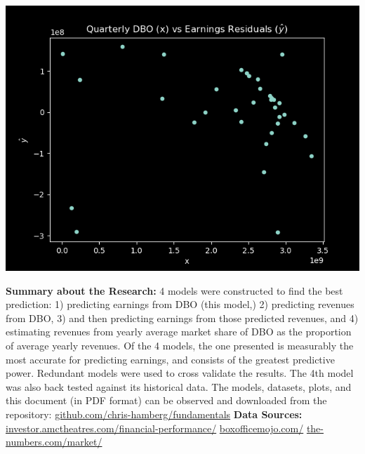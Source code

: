 \documentclass{article}
\begin{document}
\newpage
\begin{center}
    \includegraphics[scale=0.9]{residuals.png}
\end{center}
\textbf{Summary about the Research:} 4 models were constructed to find the best
prediction: 1) predicting earnings from DBO (this model,) 2) predicting revenues  
from DBO, 3) and then predicting earnings from those predicted revenues, and 4) 
estimating revenues from yearly average market share of DBO as the proportion of 
average yearly revenues. Of the 4 models, the one presented is measurably the most 
accurate for predicting earnings, and consists of the greatest predictive power. 
Redundant models were used to cross validate the results. The 4th model was also 
back tested against its historical data. The models, datasets, plots, and this 
document (in PDF format) can be observed and downloaded from the repository: 
\url{github.com/chris-hamberg/fundamentals}
\vspace{1.0cm}
\newline
\textbf{Data Sources:}
\newline \newline
\url{investor.amctheatres.com/financial-performance/}
\newline
\url{boxofficemojo.com/}
\newline
\url{the-numbers.com/market/}
\end{document}
